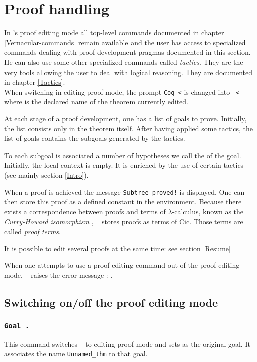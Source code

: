\chapter{Proof handling}
\label{Proof-handling}

In \Coq's proof editing mode all top-level commands documented in 
chapter \ref{Vernacular-commands} remain available
and the user has access to specialized commands dealing with proof
development pragmas documented in this section. He can also use some
other specialized commands called {\em tactics}.  They are the very
tools allowing the user to deal with logical reasoning. They are
documented in chapter \ref{Tactics}.\\ 
When switching in editing proof mode, the prompt
{\tt Coq <} is changed into {\tt {\ident} <} where {\ident} is the
declared name of the theorem currently edited.

At each stage of a proof development, one has a list of goals to
prove. Initially, the list consists only in the theorem itself. After
having applied some tactics, the list of goals contains the subgoals
generated by the tactics.

To each subgoal is associated  a number of
hypotheses we call the {\em {}} of the goal.
Initially, the local context is empty. It is enriched by the use of
certain tactics (see mainly section \ref{Intro}).

When a proof is achieved the message {\tt Subtree proved!} is
displayed. One can then store this proof as a defined constant in the
environment. Because there exists a correspondence between proofs and
terms of $\lambda$-calculus, known as the {\em Curry-Howard
isomorphism} \cite{How80,Bar91,Gir89,Hue89}, \Coq~ stores proofs as
terms of {\sc Cic}. Those terms are called {\em proof
  terms}.

It is possible to edit several proofs at the same time: see section
\ref{Resume}

\ErrMsg When one attempts to use a proof editing command out of the
proof editing mode, \Coq~ raises the error message : .

\section{Switching on/off the proof editing mode}

\subsection{\tt Goal {\form}.}
\label{Goal}
This command switches \Coq~ to editing proof mode and sets {\form} as
the original goal. It associates the name {\tt Unnamed\_thm} to
that goal.

